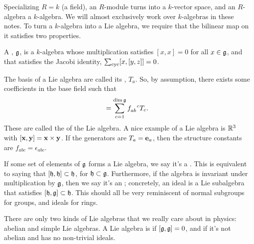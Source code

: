 \documentclass[11pt]{article}
\begin{document}
Specializing $R = k$ (a field), an $R$-module turns into a $k$-vector space,
and an $R$-algebra a $k$-algebra. We will almost exclusively work over $k$-algebras
in these notes. To turn a $k$-algebra into a Lie algebra, we require that the bilinear
map on it satisfies two properties.

\begin{definition}
    A , $\mathfrak{g}$, is a $k$-algebra whose multiplication
    satisfies $[x, x] = 0$ for all $x \in \mathfrak{g}$, and that satisfies
    the Jacobi identity, $\sum_{\rm cyc} [x, [y, z]] = 0$.
\end{definition}

The basis of a Lie algebra are called its , $T_a$.
So, by assumption, there exists some coefficients in the base field such
that
\begin{align*}
    [T_a, T_b] = \sum_{c = 1}^{\dim{\lie{g}}} \tensor{f}{_{ab}^c} T_c.
\end{align*}
These are called the  of the Lie algebra. 
A nice example of a Lie algebra is $\mathbb{R}^3$ with 
$[\mathbf{x}, \mathbf{y}] = \mathbf{x} \times \mathbf{y}$.
If the generators are $T_a = \mathbf{e}_a$, then the structure constants
are $f_{abc} = \epsilon_{abc}$.

If some set of elements of $\mathfrak{g}$ forms a Lie algebra, we say
it's a . This is equivalent to saying that $[\mathfrak{h}, \mathfrak{h}] \subset \mathfrak{h}$,
for $\mathfrak{h} \subset \mathfrak{g}$. Furthermore, if the algebra is invariant
under multiplication by $\mathfrak{g}$, then we say it's an ;
concretely, an ideal is a Lie subalgebra that satisfies $[\mathfrak{h}, \mathfrak{g}] \subset \mathfrak{h}$.
This should all be very reminiscent of normal subgroups for groups,
and ideals for rings.

There are only two kinds of Lie algebras that we really care about in
physics: abelian and simple Lie algebras. A Lie algebra is 
if $[\mathfrak{g}, \mathfrak{g}] = 0$, and  if it's not abelian and has
no non-trivial ideals.
\end{document}
